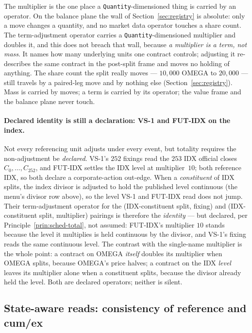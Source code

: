 The multiplier is the one place a \texttt{Quantity}-dimensioned thing is carried by an
operator. On the balance plane the wall of Section~\ref{sec:registry} is absolute: only a
move changes a quantity, and no market data operator touches a share count. The term-adjustment
operator carries a \texttt{Quantity}-dimensioned multiplier and doubles it, and this does not
breach that wall, because \emph{a multiplier is a term, not mass}. It names how many
underlying units one contract controls; adjusting it re-describes the same contract in the
post-split frame and moves no holding of anything. The share count the split really moves ---
$10{,}000$ OMEGA to $20{,}000$ --- still travels by a paired-leg move and by nothing else
(Section~\ref{sec:registry}). Mass is carried by moves; a term is carried by its operator; the
value frame and the balance plane never touch.

\paragraph{Declared identity is still a declaration: VS-1 and FUT-IDX on the index.} Not every
referencing unit adjusts under every event, but totality requires the non-adjustment be
\emph{declared}. VS-1's $252$ fixings read the $253$ IDX official closes $C_0,\dots,C_{252}$, and FUT-IDX settles the IDX
level at multiplier~$10$; both reference IDX, so both declare a corporate-action out-edge. When
a \emph{constituent} of IDX splits, the index divisor is adjusted to hold the published level
continuous (the menu's divisor row above), so the level VS-1 and FUT-IDX read does not jump.
Their term-adjustment operator for the (IDX-constituent split, fixing) and (IDX-constituent
split, multiplier) pairings is therefore the \emph{identity} --- but declared, per
Principle~\ref{prin:sched-total}, not assumed: FUT-IDX's multiplier $10$ stands because the
level it multiplies is held continuous by the divisor, and VS-1's fixing reads the same
continuous level. The contrast with the single-name multiplier is the whole point: a contract
on OMEGA \emph{itself} doubles its multiplier when OMEGA splits, because OMEGA's price halves;
a contract on the IDX \emph{level} leaves its multiplier alone when a constituent splits,
because the divisor already held the level. Both are declared operators; neither is silent.

\subsection{State-aware reads: consistency of reference and cum/ex}\label{sec:witness}

